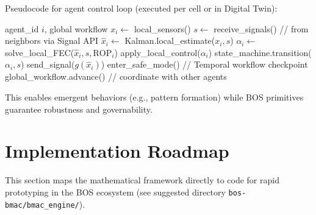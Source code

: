 \documentclass[11pt,a4paper]{article}
\begin{document}
Pseudocode for agent control loop (executed per cell or in Digital Twin):

\begin{algorithmic}[1]
\REQUIRE agent\_id \(i\), global workflow
\STATE \(x_i \leftarrow\) local\_sensors()
\STATE \(s \leftarrow\) receive\_signals()  // from neighbors via Signal API
\STATE \(\hat{x}_i \leftarrow\) Kalman.local\_estimate(\(x_i, s\))
    \STATE \(\alpha_i \leftarrow\) solve\_local\_FEC(\(\hat{x}_i, s, \text{ROP}_i\))
    \STATE apply\_local\_control(\(\alpha_i\))
    \STATE state\_machine.transition(\(\alpha_i, s\))
    \STATE send\_signal(\(g(\hat{x}_i)\))
\ELSE
    \STATE enter\_safe\_mode()  // Temporal workflow checkpoint
\ENDIF
\STATE global\_workflow.advance()  // coordinate with other agents
\end{algorithmic}

This enables emergent behaviors (e.g., pattern formation) while BOS primitives guarantee robustness and governability.

\section{Implementation Roadmap}

This section maps the mathematical framework directly to code for rapid prototyping in the BOS ecosystem (see suggested directory \texttt{bos-bmac/bmac\_engine/}).
\end{document}

